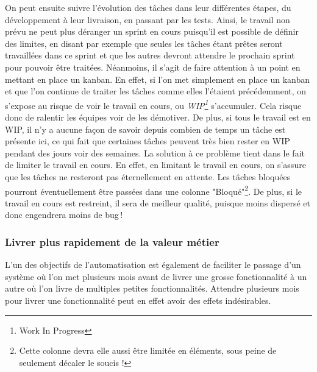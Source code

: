 
On peut ensuite suivre l'évolution des tâches dans leur différentes étapes, du développement à leur livraison, en passant par les tests. Ainsi, le travail non prévu ne peut plus déranger un sprint en cours puisqu'il est possible de définir des limites, en disant par exemple que seules les tâches étant prêtes seront travaillées dans ce sprint et que les autres devront attendre le prochain sprint pour pouvoir être traitées. Néanmoins, il s'agit de faire attention à un point en mettant en place un kanban. En effet, si l'on met simplement en place un kanban et que l'on continue de traiter les tâches comme elles l'étaient précédemment, on s'expose au risque de voir le travail en cours, ou \emph{WIP\footnote{Work In Progress}} s'accumuler. Cela risque donc de ralentir les équipes voir de les démotiver. De plus, si tous le travail est en WIP, il n'y a aucune façon de savoir depuis combien de temps un tâche est présente ici, ce qui fait que certaines tâches peuvent très bien rester en WIP pendant des jours voir des semaines. La solution à ce problème tient dans le fait de limiter le travail en cours. En effet, en limitant le travail en cours, on s'assure que les tâches ne resteront pas éternellement en attente. Les tâches bloquées pourront éventuellement être passées dans une colonne "Bloqué"\footnote{Cette colonne devra elle aussi être limitée en éléments, sous peine de seulement décaler le soucis !}. De plus, si le travail en cours est restreint, il sera de meilleur qualité, puisque moins dispersé et donc engendrera moins de bug !

\subsubsection{Livrer plus rapidement de la valeur métier}
L'un des objectifs de l'automatisation est également de faciliter le passage d'un système où l'on met plusieurs mois avant de livrer une grosse fonctionnalité à un autre où l'on livre de multiples petites fonctionnalités. Attendre plusieurs mois pour livrer une fonctionnalité peut en effet avoir des effets indésirables.

